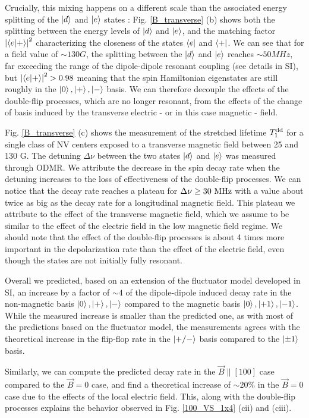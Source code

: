 \documentclass[preprintnumbers,amsmath,amssymb,superscriptaddress,twocolumn,showpacs]{revtex4-2}
\begin{document}
Crucially, this mixing happens on a different scale than the associated energy splitting of the $\ket{d}$ and $\ket{e}$ states : Fig. \ref{B_transverse} (b) shows both the splitting between the energy levels of $\ket{d}$ and $\ket{e}$, and the matching factor $\abs{\bra{e}\ket{+}}^2$ characterizing the closeness of the states $\bra{e}$ and $\bra{+}$. We can see that for a field value of $\sim 130 G$, the splitting between the $\ket{d}$ and $\ket{e}$ reaches $\sim 50 MHz$, far exceeding the range of the dipole-dipole resonant coupling (see details in SI), but $\abs{\bra{e}\ket{+}}^2 > 0.98$ meaning that the spin Hamiltonian eigenstates are still roughly in the $\ket{0}, \ket{+}, \ket{-}$ basis. We can therefore decouple the effects of the double-flip processes, which are no longer resonant, from the effects of the change of basis induced by the transverse electric - or in this case magnetic - field.

Fig. \ref{B_transverse} (c) shows the measurement of the stretched lifetime $T_1^{\rm dd}$ for a single class of NV centers exposed to a transverse magnetic field between 25 and 130 G. The detuning $\Delta \nu$ between the two states $\ket{d}$ and $\ket{e}$ was measured through ODMR. We attribute the decrease in the spin decay rate when the detuning increases to the loss of effectiveness of the double-flip processes. We can notice that the decay rate reaches a plateau for $\Delta \nu \geq 30\ \rm MHz$ with a value about twice as big as the decay rate for a longitudinal magnetic field. This plateau we attribute to the effect of the transverse magnetic field, which we assume to be similar to the effect of the electric field in the low magnetic field regime. We should note that the effect of the double-flip processes is about 4 times more important in the depolarization rate than the effect of the electric field, even though the states are not initially fully resonant.

Overall we predicted, based on an extension of the fluctuator model developed in SI, an increase by a factor of $\sim 4$ of the dipole-dipole induced decay rate in the non-magnetic basis $\ket{0}, \ket{+}, \ket{-}$ compared to the magnetic basis $\ket{0}, \ket{+1}, \ket{-1}$. While the measured increase is smaller than the predicted one, as with most of the predictions based on the fluctuator model, the measurements agrees with the theoretical increase in the flip-flop rate in the $\ket{+/-}$ basis compared to the $\ket{\pm 1}$ basis.

Similarly, we can compute the predicted decay rate in the $\vec B \parallel \left[100\right]$ case compared to the $\vec B = 0$ case, and find a theoretical increase of $\sim 20\%$ in the $\vec B = 0$ case due to the effects of the local electric field. This, along with the double-flip processes explains the behavior observed in Fig. \ref{100_VS_1x4} (cii) and (ciii).
\end{document}
